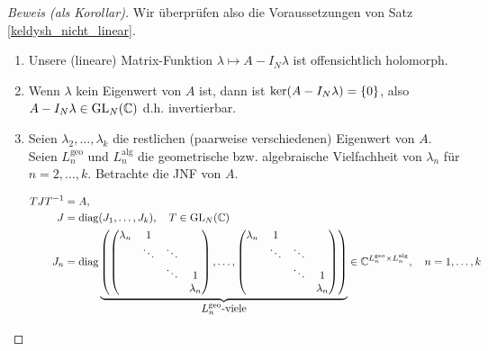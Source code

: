 \begin{proof}[Beweis (als Korollar)]

    Wir überprüfen also die Voraussetzungen von Satz \ref{keldysh_nicht_linear}.

    \begin{enumerate}[label = \arabic*.]

        \item Unsere (lineare) Matrix-Funktion $\lambda \mapsto A - I_N \lambda$ ist offensichtlich holomorph.
        
        \item Wenn $\lambda$ kein Eigenwert von $A$ ist, dann ist $\operatorname{ker}(A - I_N \lambda) = {\left \{ 0 \right \}}$, also $A - I_N \lambda \in \operatorname{GL}_N(\mathbb{C})$ d.h. invertierbar.
        
        \item Seien $\lambda_2, \dots, \lambda_k$ die restlichen (paarweise verschiedenen) Eigenwert von $A$.
        Seien $L_n^\mathrm{geo}$ und $L_n^\mathrm{alg}$ die geometrische bzw. algebraische Vielfachheit von $\lambda_n$ für $n = 2, \dots, k$.
        Betrachte die JNF von $A$.
    
        \begin{align*}
            T J T^{-1} & = A, \\
            J & = \operatorname{diag} (J_1, \dots, J_k),
            \quad
            T \in \operatorname{GL}_N(\mathbb{C}) \\
            J_n
            & =
            \operatorname{diag}
            \underbrace
            {
                {\left ( 
                    \begin{pmatrix}
                        \lambda_n & 1      &        &           \\
                                  & \ddots & \ddots &           \\
                                  &        & \ddots & 1         \\
                                  &        &        & \lambda_n \\
                    \end{pmatrix},
                    \dots,
                    \begin{pmatrix}
                        \lambda_n & 1      &        &           \\
                                  & \ddots & \ddots &           \\
                                  &        & \ddots & 1         \\
                                  &        &        & \lambda_n \\
                    \end{pmatrix}
                 \right )}
            }_{
                \displaystyle
                L_n^\mathrm{geo} \text{-viele}
            }
            \in
            \mathbb{C}^{
                L_n^\mathrm{geo}
                \times
                L_n^\mathrm{alg}
            },
            \quad
            n = 1, \dots, k
        \end{align*}
    

\end{enumerate}
\end{proof}
